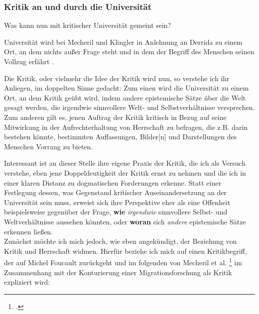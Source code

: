 \subsubsection{Kritik an und durch die Universität}

Was kann nun mit kritischer Universität gemeint sein? 

Universität wird bei
Mecheril und Klingler in Anlehnung an Derrida \footnotemark
{} zu einem Ort, an dem nichts
außer Frage steht und in dem der \glqq Begriff des Menschen seinen Vollzug
erfährt \grqq\footnotemark {}. 

Die Kritik, oder vielmehr die Idee der Kritik wird nun, so verstehe
ich ihr Anliegen, im doppelten Sinne gedacht: 
Zum einen wird die Universität zu
einem Ort, an dem Kritik geübt wird, indem \glqq andere epistemische Sätze\grqq \footnotemark {} über
die Welt gesagt werden, die \glqq irgendwie sinnvollere Welt- und
Selbstverhältnisse\grqq\footnotemark {} versprechen. 
Zum anderen gilt es, jenen Auftrag der Kritik
kritisch in Bezug auf seine Mitwirkung in der Aufrechterhaltung von Herrschaft
zu befragen, die z.B. darin bestehen könnte, bestimmten \glqq Auffassungen,
Bilder[n] und Darstellungen des Menschen\grqq\footnotemark
{} Vorrang zu bieten.

Interessant ist an dieser Stelle ihre eigene Praxis der Kritik, die ich als Versuch verstehe,
eben jene Doppeldeutigkeit der Kritik ernst zu nehmen und die ich in einer
klaren Distanz zu dogmatischen Forderungen erkenne. Statt einer Festlegung
dessen, was Gegenstand kritischer Auseinandersetzung an der Universität sein
muss, erweist sich ihre Perspektive eher als eine Offenheit beispielsweise
gegenüber der Frage, \textbf{wie} \textit{irgendwie} sinnvollere Selbst- und Weltverhältnisse
aussehen könnten, oder \textbf{woran} sich \textit{andere} epistemische Sätze erkennen ließen. 
\\


Zunächst möchte ich mich jedoch, wie eben angekündigt, der Beziehung von
Kritik und Herrschaft widmen. Hierfür beziehe ich mich auf einen Kritikbegriff,
der auf Michel Foucault zurückgeht und im folgenden von Mecheril et al.
\footnotemark \footcitetext{mecherilmigration} im
Zusammenhang mit der Konturierung einer Migrationsforschung als Kritik
expliziert wird: 
\\ 

